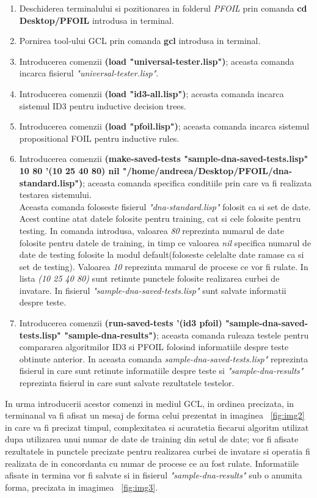 \documentclass[a4paper,12pt]{report}
\begin{document}
\begin{enumerate}
\item Deschiderea terminalului si pozitionarea in folderul \textit{PFOIL} prin comanda \textbf{cd Desktop/PFOIL} introdusa in terminal.
\item Pornirea tool-ului GCL prin comanda \textbf{gcl} introdusa in terminal.
\item Introducerea comenzii \textbf{(load "universal-tester.lisp")}; aceasta comanda incarca fisierul \textit{"universal-tester.lisp"}. 
\item Introducerea comenzii \textbf{(load "id3-all.lisp")}; aceasta comanda incarca sistemul ID3 pentru inductive decision trees.
\item Introducerea comenzii \textbf{(load "pfoil.lisp")}; aceasta comanda incarca sistemul propositional FOIL pentru inductive rules.
\item Introducerea comenzii \textbf{(make-saved-tests "sample-dna-saved-tests.lisp" 10 80 '(10 25 40 80) nil "/home/andreea/Desktop/PFOIL/dna-standard.lisp")}; aceasta comanda specifica conditiile prin care va fi realizata testarea sistemului.\\
	Aceasta comanda foloseste fisierul \textit{"dna-standard.lisp"} folosit ca si set de date. Acest contine atat datele folosite pentru training, cat si cele folosite pentru testing. In comanda introdusa, valoarea \textit{80} reprezinta numarul de date folosite pentru datele de training, in timp ce valoarea \textit{nil} specifica numarul de date de testing folosite la modul default(foloseste celelalte date ramase ca si set de testing). Valoarea \textit{10} reprezinta numarul de procese ce vor fi rulate. In lista \textit{(10 25 40 80)} sunt retinute punctele folosite realizarea curbei de invatare. In fisierul \textit{"sample-dna-saved-tests.lisp"} sunt salvate informatii despre teste.
\item Introducerea comenzii \textbf{(run-saved-tests '(id3 pfoil) "sample-dna-saved-tests.lisp" "sample-dna-results")}; aceasta comanda ruleaza testele pentru compararea algoritmilor ID3 si PFOIL folosind informatiile despre teste obtinute anterior.
	In aceasta comanda \textit{sample-dna-saved-tests.lisp"} reprezinta fisierul in care sunt retinute informatiile despre teste si \textit{"sample-dna-results"}  reprezinta fisierul in care sunt salvate rezultatele testelor.
\end{enumerate}
	In urma introducerii acestor comenzi in mediul GCL, in ordinea precizata, in terminanal va fi afisat un mesaj de forma celui prezentat in imaginea ~\ref{fig:img2} in care va fi precizat timpul, complexitatea si acuratetia fiecarui algoritm utilizat dupa utilizarea unui numar de date de training din setul de date; vor fi afisate rezultatele in punctele precizate pentru realizarea curbei de invatare si operatia fi realizata de in concordanta cu numar de procese ce au fost rulate. Informatiile afisate in termina vor fi salvate si in fisierul \textit{"sample-dna-results"} sub o anumita forma, precizata in imagimea ~\ref{fig:img3}.
	
\end{document}
